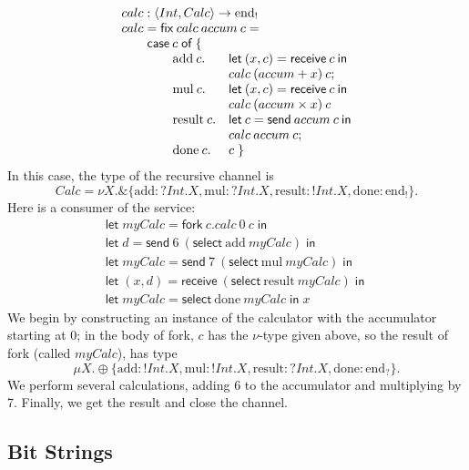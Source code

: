 \documentclass[orivec,envcountsame]{llncs}
\newcommand{\with}{\mathbin\binampersand}
\newcommand{\gvout}[2]{{!#1.#2}}
\newcommand{\gvin}[2]{{?#1.#2}}
\newcommand{\uto}{\ensuremath{\rightarrow}}
\newcommand{\outterm}{\mathrm{end}_!}
\newcommand{\interm}{\mathrm{end}_?}
\newcommand{\mkwd}[1]{\mathsf{#1}}
\newcommand{\tkwd}[1]{\textsf{#1}}
\newcommand{\clabel}[1]{\mathrm{#1}}
\newcommand{\gvsend}[2]{\mkwd{send}\:#1\:#2}
\newcommand{\gvreceive}[1]{\mkwd{receive}\:#1}
\newcommand{\gvlet}[3]{\mkwd{let}\;#1 = #2\;\mkwd{in}\;#3}
\newcommand{\gvselect}[2]{\mkwd{select}\:#1\:#2}
\newcommand{\gvfork}[2]{\mkwd{fork}\:#1.#2}
\newcommand{\lrkwd}{\mkwd{fix}}
\newcommand{\todo}[1]{{\noindent\small\color{red} \framebox{\parbox{\dimexpr\linewidth-2\fboxsep-2\fboxrule}{\textbf{TODO:} #1}}}}
\begin{document}
\[\begin{array}{llll}
 \mcl{4}{calc : \langle Int, Calc \rangle \uto \outterm} \\
 \mcl{4}{calc = \lrkwd\:calc\:accum\:c =} \\
 \quad & \mcl{3}{\mkwd{case}\:c\;\mkwd{of}\:\{} \\
 & \quad & \clabel{add}\:c. &\mkwd{let}\:(x,c) = \gvreceive{c} \: \mkwd{in} \\
 & & & calc\:(accum + x)\:c; \\
 & & \clabel{mul}\:c. &\mkwd{let}\:(x,c) = \gvreceive{c}\:\mkwd{in} \\
 & & & calc\:(accum \times x)\:c \\
 & & \clabel{result}\:c. &\mkwd{let}\:c = \gvsend{accum}{c}\:\mkwd{in} \\
 & & & calc\:accum\:c; \\
 & & \clabel{done}\:c.& c \; \}
\end{array}\]
In this case, the type of the recursive channel is
\[
 Calc = \nu X. \with \{ \clabel{add}: \gvin{Int}{X}, \clabel{mul}: \gvin{Int}{X}, \clabel{result}: \gvout{Int}{X}, \clabel{done}: \outterm \}.
\]%
Here is a consumer of the service:
\[\begin{array}{l}
  \gvlet{myCalc}{\gvfork{c}{calc\:0\:c}}{} \\
  \gvlet{d}{\gvsend{6}{(\gvselect{\clabel{add}}{myCalc})}}{} \\
  \gvlet{myCalc}{\gvsend{7}{(\gvselect{\clabel{mul}}{myCalc})}}{} \\
  \gvlet{(x,d)}{\gvreceive{(\gvselect{\clabel{result}}{myCalc})}}{} \\
  \gvlet{myCalc}{\gvselect{\clabel{done}}{myCalc}}{x}
\end{array}\]
We begin by constructing an instance of the calculator with the accumulator starting at 0; in the
body of \tkwd{fork}, $c$ has the $\nu$-type given above, so the result of \tkwd{fork} (called
$myCalc$), has type
\[
\mu X. \oplus \{ \clabel{add}: \gvout{Int}{X}, \clabel{mul}: \gvout{Int}{X}, \clabel{result}: \gvin{Int}{X}, \clabel{done}: \interm \}.
\]
We perform several calculations, adding 6 to the accumulator and multiplying by 7.  Finally, we get
the result and close the channel.

\subsection{Bit Strings}
%
\end{document}
